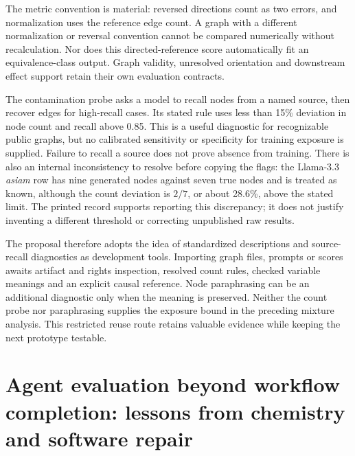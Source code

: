 The metric convention is material: reversed directions count as two errors,
and normalization uses the reference edge count. A graph with a different
normalization or reversal convention cannot be compared numerically without
recalculation. Nor does this directed-reference score automatically fit an
equivalence-class output. Graph validity, unresolved orientation and
downstream effect support retain their own evaluation contracts.
\citep{exec14_l7_causalgraphbench}

The contamination probe asks a model to recall nodes from a named source,
then recover edges for high-recall cases. Its stated rule uses less than
15\% deviation in node count and recall above 0.85. This is a useful
diagnostic for recognizable public graphs, but no calibrated sensitivity
or specificity for training exposure is supplied. Failure to recall a source
does not prove absence from training. There is also an internal inconsistency
to resolve before copying the flags: the Llama-3.3 \emph{asiam} row has nine
generated nodes against seven true nodes and is treated as known, although
the count deviation is \(2/7\), or about 28.6\%, above the stated limit.
The printed record supports reporting this discrepancy; it does not justify
inventing a different threshold or correcting unpublished raw results.
\citep{exec14_l7_causalgraphbench,exec14_l7_frontier_exact}

The proposal therefore adopts the idea of standardized descriptions and
source-recall diagnostics as development tools. Importing graph files,
prompts or scores awaits artifact and rights inspection, resolved count
rules, checked variable meanings and an explicit causal reference.
Node paraphrasing can be an additional diagnostic only when the meaning
is preserved. Neither the count probe nor paraphrasing supplies the
exposure bound in the preceding mixture analysis. This restricted reuse
route retains valuable evidence while keeping the next prototype testable.

\label{exec14:l7-frontier-end}


\section[Agent evaluation beyond workflow completion]{Agent evaluation beyond workflow completion: lessons from chemistry and software repair}
\label{sec:exec25-cow}

